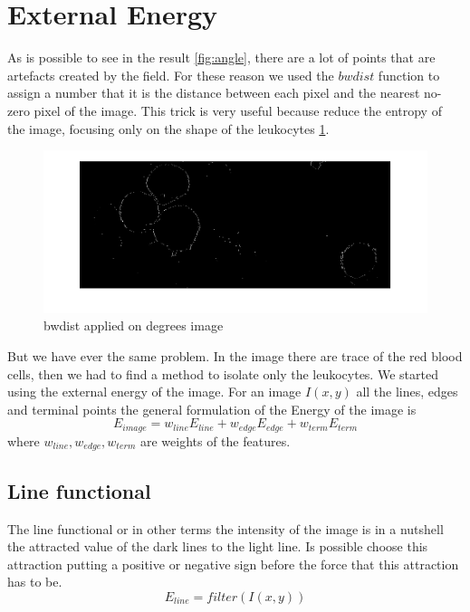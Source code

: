 \section{External Energy}
As is possible to see in the result \ref{fig:angle}, there are a lot of points that are artefacts created by the field. For these reason we used the $bwdist$ function to assign a number that it is the distance between each pixel and the nearest no-zero pixel of the image. This trick is very useful because reduce the entropy of the image, focusing only on the shape of the leukocytes \ref{fig:bwdistangle}.
\begin{figure}
	\begin{center}
		\centering
		\includegraphics[scale=0.5]{img/bwdistAngle.png}
		\caption{bwdist applied on degrees image}
		\label{fig:bwdistangle}
	\end{center}
\end{figure}
But we have ever the same problem. In the image there are trace of the red blood cells, then we had to find a method to isolate only the leukocytes. We started using the external energy of the image. For an image $I(x,y)$ all the lines, edges and terminal points the general formulation of the Energy of the image is
\begin{equation}
 E_{image}=w_{line}E_{line} + w_{edge}E_{edge} + w_{term}E_{term}
\end{equation}
where $w_{line}, w_{edge}, w_{term}$ are weights of the features.

\subsection{Line functional}
The line functional or in other terms the intensity of the image is in a nutshell the attracted value of the dark lines to the light line. Is possible choose this attraction putting a positive or negative sign before the force that this attraction has to be.
\begin{equation}
	E_{{line}}=filter(I(x,y))
\end{equation}

